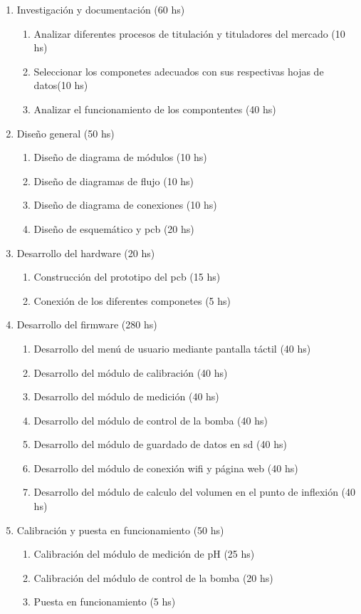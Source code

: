 \documentclass[11pt]{charter}
\begin{document}
\begin{enumerate}
\item Investigación y documentación (60 hs)
	\begin{enumerate}
	\item Analizar diferentes procesos de titulación y tituladores del mercado (10 hs)
	\item Seleccionar los componetes adecuados con sus respectivas hojas de datos(10 hs)
	\item Analizar el funcionamiento de los compontentes (40 hs)
	\end{enumerate}
\item Diseño general (50 hs)
	\begin{enumerate}
	\item Diseño de diagrama de módulos (10 hs)
	\item Diseño de diagramas de flujo (10 hs)
	\item Diseño de diagrama de conexiones (10 hs)
	\item Diseño de esquemático y pcb (20 hs)
	\end{enumerate}
\item Desarrollo del hardware (20 hs)
	\begin{enumerate}
	\item Construcción del prototipo del pcb (15 hs)
	\item Conexión de los diferentes componetes (5 hs)
	\end{enumerate}
\item Desarrollo del firmware (280 hs)	
	\begin{enumerate}
	\item Desarrollo del menú de usuario mediante pantalla táctil (40 hs)
	\item Desarrollo del módulo de calibración (40 hs)
	\item Desarrollo del módulo de medición (40 hs)
	\item Desarrollo del módulo de control de la bomba (40 hs)
	\item Desarrollo del módulo de guardado de datos en sd (40 hs)
	\item Desarrollo del módulo de conexión wifi y página web (40 hs)
	\item Desarrollo del módulo de calculo del volumen en el punto de inflexión (40 hs)
	\end{enumerate}
\item Calibración y puesta en funcionamiento (50 hs)
	\begin{enumerate}	
	\item Calibración del módulo de medición de pH (25 hs)
	\item Calibración del módulo de control de la bomba (20 hs)
	\item Puesta en funcionamiento  (5 hs)
	\end{enumerate}
		

\end{enumerate}
\end{document}
